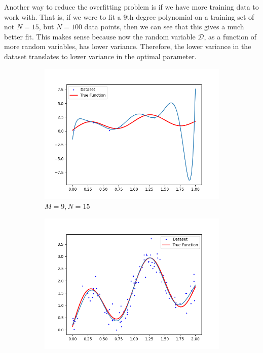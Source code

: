 \documentclass{article}
\theoremstyle{definition}
\begin{document}
    Another way to reduce the overfitting problem is if we have more training data to work with. That is, if we were to fit a 9th degree polynomial on a training set of not $N = 15$, but $N = 100$ data points, then we can see that this gives a much better fit. This makes sense because now the random variable $\mathcal{D}$, as a function of more random variables, has lower variance. Therefore, the lower variance in the dataset translates to lower variance in the optimal parameter. 
    \begin{figure}[hbt!]
        \centering
        \begin{subfigure}[b]{0.48\textwidth}
        \centering
            \includegraphics[width=\textwidth]{polynomial_first/poly_9_fit.png}
            \caption{$M = 9, N = 15$}
            \label{fig:less_points}
        \end{subfigure}
        \hfill 
        \begin{subfigure}[b]{0.48\textwidth}
        \centering
            \includegraphics[width=\textwidth]{polynomial_first/increased_data.png}

\end{subfigure}
\end{figure}
\end{document}
